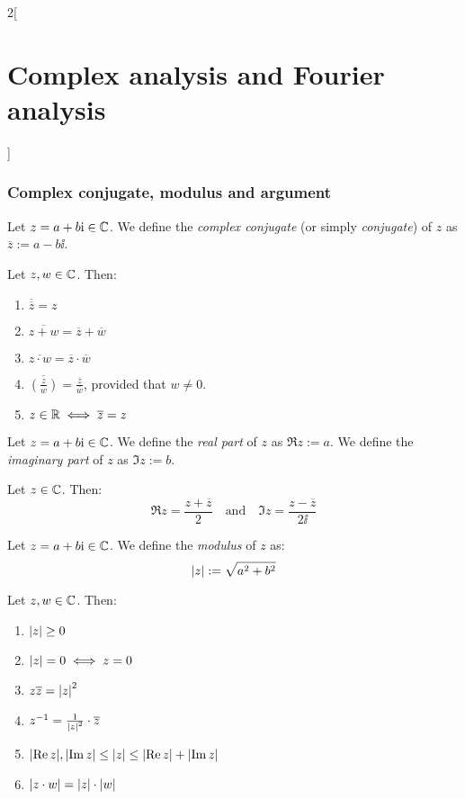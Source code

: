 \documentclass[../../../main.tex]{subfiles}
\begin{document}
\begin{multicols}{2}[\section{Complex analysis and Fourier analysis}]
  \subsubsection{Complex conjugate, modulus and argument}
  \begin{definition}
    Let $z=a+b\mathrm{i}\in\mathbb{C}$. We define the \emph{complex conjugate} (or simply \emph{conjugate}) of $z$ as $\overline{z}:=a-b\ii$.
  \end{definition}
  \begin{proposition}
    Let $z,w\in\mathbb{C}$. Then:
    \begin{enumerate}
      \item $\overline{\overline{z}}=z$
      \item $\overline{z+w}=\overline{z}+\overline{w}$
      \item $\overline{z\cdot w}=\overline{z}\cdot\overline{w}$
      \item $\displaystyle\overline{\left(\frac{z}{w}\right)}=\frac{\overline{z}}{\overline{w}}$, provided that $w\ne 0$.
      \item $z\in\mathbb{R}\iff \overline{z}=z$
    \end{enumerate}
  \end{proposition}
  \begin{definition}
    Let $z=a+b\mathrm{i}\in\mathbb{C}$. We define the \emph{real part} of $z$ as $\Re z:=a$. We define the \emph{imaginary part} of $z$ as $\Im z:=b$.
  \end{definition}
  \begin{proposition}
    Let $z\in\mathbb{C}$. Then: $$\Re z=\frac{z+\overline{z}}{2}\quad\text{and}\quad\Im z=\frac{z-\overline{z}}{2\ii}$$
  \end{proposition}
  \begin{definition}
    Let $z=a+b\mathrm{i}\in\mathbb{C}$. We define the \emph{modulus} of $z$ as: $$\abs{z}:=\sqrt{a^2+b^2}$$
  \end{definition}
  \begin{proposition}
    Let $z,w\in\mathbb{C}$. Then:
    \begin{enumerate}
      \item $\abs{z}\geq 0$
      \item $\abs{z}=0\iff z=0$
      \item $z\overline{z}={\abs{z}}^2$
      \item $z^{-1}=\frac{1}{{\abs{z}}^2}\cdot\overline{z}$
      \item $\abs{\Re z},\abs{\Im z}\leq \abs{z}\leq\abs{\Re z}+\abs{\Im z}$
      \item $\abs{z\cdot w}=\abs{z}\cdot \abs{w}$

\end{enumerate}
\end{proposition}
\end{multicols}
\end{document}
